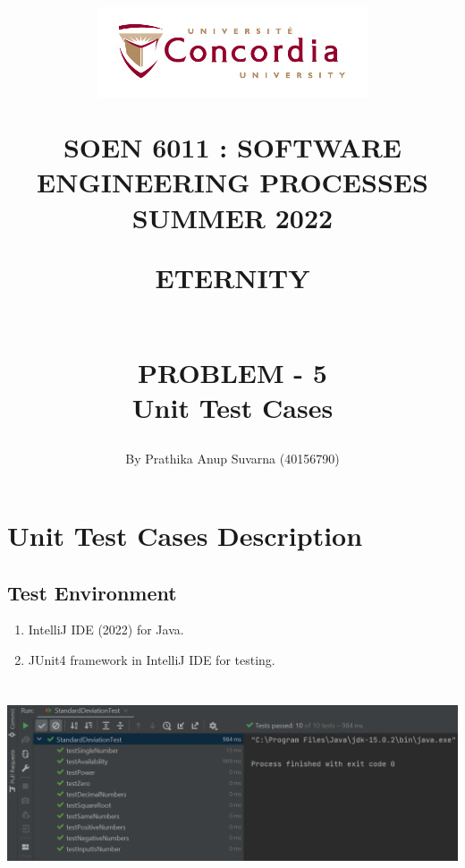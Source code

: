 \documentclass[12pt,letterpaper]{report}
\begin{document}
\title{\begin{figure}[htb]
\begin{center}
\includegraphics[width=8cm]{univ_logo}
\end{center}
\end{figure}SOEN 6011 : SOFTWARE ENGINEERING PROCESSES\\[.5em]
SUMMER 2022\\\vspace*{0.9in}
\begin{Large}
\textbf{ETERNITY} 
\end{Large}
\vspace*{0.9in}
\begin{Large}
\textbf{\\PROBLEM - 5} 
\\Unit Test Cases\\
\end{Large}}
\author{By Prathika Anup Suvarna (40156790)}
\maketitle 
{}
\setcounter{page}{0}

\tableofcontents


\chapter{Unit Test Cases Description}

\section{Test Environment}
\begin{enumerate}
\item IntelliJ IDE (2022) for Java.
\item JUnit4 framework in IntelliJ IDE for testing.
\end{enumerate}

\begin{center}
\includegraphics[width=15cm,height=6cm]{UnitTest}
\end{center}
\end{document}
